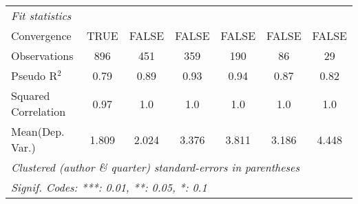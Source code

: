 \begin{tabular}{lcccccc}
   \midrule
   \emph{Fit statistics}\\
   Convergence                                                &TRUE           & FALSE      & FALSE       & FALSE         & FALSE        & FALSE\\  
   Observations                                               & 896           & 451        & 359         & 190           & 86           & 29\\  
   Pseudo R$^2$                                               & 0.79          & 0.89       & 0.93        & 0.94          & 0.87         & 0.82\\  
   Squared Correlation                                        & 0.97          & 1.0        & 1.0         & 1.0           & 1.0          & 1.0\\  
Mean(Dep. Var.) & 1.809 & 2.024 & 3.376 & 3.811 & 3.186 & 4.448 \\
   \midrule \midrule
   \multicolumn{7}{l}{\emph{Clustered (author \& quarter) standard-errors in parentheses}}\\
   \multicolumn{7}{l}{\emph{Signif. Codes: ***: 0.01, **: 0.05, *: 0.1}}\\
\end{tabular}
\par\endgroup
